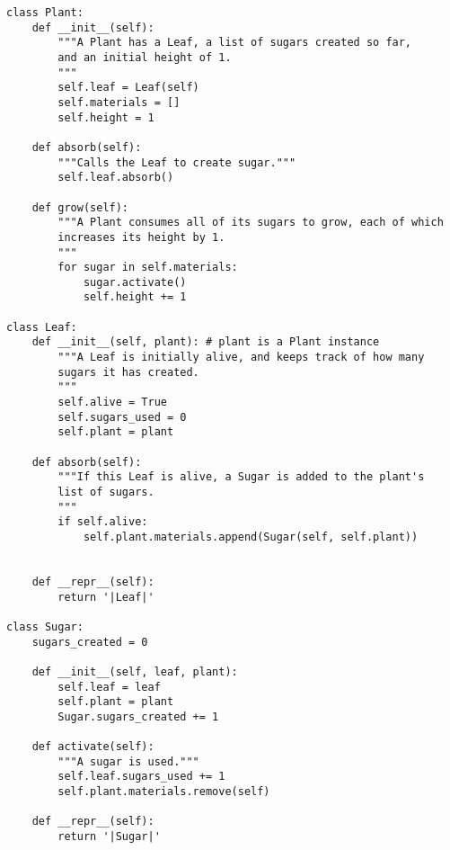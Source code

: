\begin{solution}
\begin{lstlisting}
class Plant:
    def __init__(self):
        """A Plant has a Leaf, a list of sugars created so far,
        and an initial height of 1.
        """
        self.leaf = Leaf(self)
        self.materials = []
        self.height = 1

    def absorb(self):
        """Calls the Leaf to create sugar."""
        self.leaf.absorb()

    def grow(self):
        """A Plant consumes all of its sugars to grow, each of which
        increases its height by 1.
        """
        for sugar in self.materials:
            sugar.activate()
            self.height += 1

class Leaf:
    def __init__(self, plant): # plant is a Plant instance
        """A Leaf is initially alive, and keeps track of how many
        sugars it has created.
        """
        self.alive = True
        self.sugars_used = 0
        self.plant = plant

    def absorb(self):
        """If this Leaf is alive, a Sugar is added to the plant's
        list of sugars.
        """
        if self.alive:
            self.plant.materials.append(Sugar(self, self.plant))


    def __repr__(self):
        return '|Leaf|'

class Sugar:
    sugars_created = 0

    def __init__(self, leaf, plant):
        self.leaf = leaf
        self.plant = plant
        Sugar.sugars_created += 1

    def activate(self):
        """A sugar is used."""
        self.leaf.sugars_used += 1
        self.plant.materials.remove(self)

    def __repr__(self):
        return '|Sugar|'
\end{lstlisting}
\end{solution}
